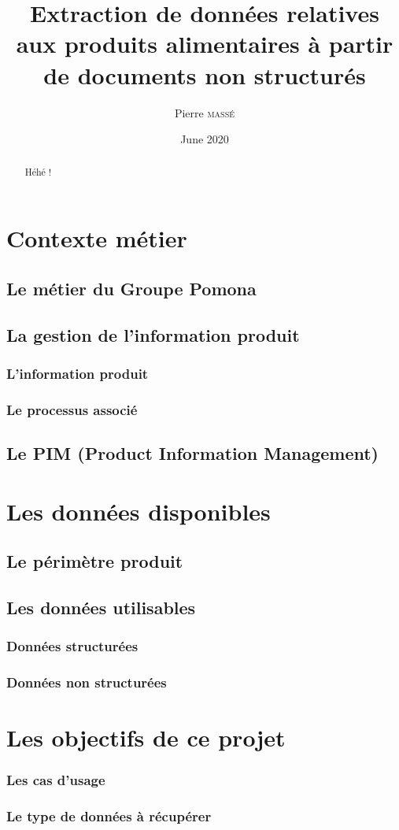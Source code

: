\documentclass{report}
\title{Extraction de données relatives aux produits alimentaires à partir de documents non structurés}
\author{Pierre \textsc{massé}}
\date{June 2020}
\begin{document}
\maketitle

\begin{abstract}
Héhé !
\end{abstract}

\tableofcontents

\part{Contexte métier}
    \chapter{Le métier du Groupe Pomona}
    \chapter{La gestion de l'information produit}
        \section{L'information produit}
        \section{Le processus associé}
    \chapter{Le PIM (Product Information Management)}
\part{Les données disponibles}
    \chapter{Le périmètre produit}
    \chapter{Les données utilisables}
        \section{Données structurées}
        \section{Données non structurées}
\part{Les objectifs de ce projet}
        \section{Les cas d'usage}
        \section{Le type de données à récupérer}
\end{document}
